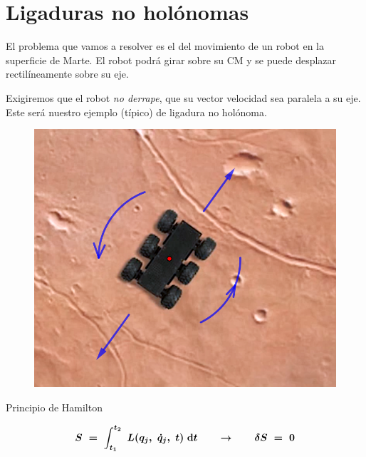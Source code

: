 \chapter{Ligaduras no holónomas}



\vspace{10mm}
\begin{adjustwidth}{50pt}{50pt}
\begin{ejemplo}
El problema que vamos a resolver es el del movimiento de un robot en la superficie de Marte. El robot podrá girar sobre su CM y se puede desplazar rectilíneamente sobre su eje.

Exigiremos que el robot \emph{no derrape}, que su vector velocidad sea paralela a su eje. Este será nuestro ejemplo (típico) de ligadura no holónoma.

\begin{figure}[H]
		\centering
		\includegraphics[width=.75\textwidth]{imagenes/img09-01.png}
	\end{figure}

\vspace{2mm}
\end{ejemplo}
\end{adjustwidth}

\begin{myblock}{Principio de Hamilton}

\begin{large}
\begin{equation}
\boldsymbol{
S\ = \ \displaystyle \int_{t_1}^{t_2} \ L(q_j,\ \dot q_j,\ t) \ \dd t 
\quad \quad \to \quad \quad \var S\ = \ 0
}
\end{equation}
\end{large}
\end{myblock}



